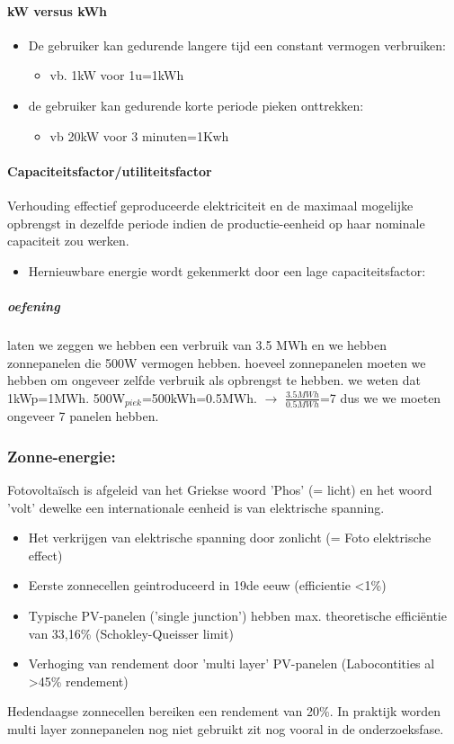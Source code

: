 \documentclass[12pt]{article}
\begin{document}
\paragraph{kW versus kWh}
\begin{itemize}
    \item De gebruiker kan gedurende langere tijd een constant vermogen verbruiken:\begin{itemize}
        \item vb. 1kW voor 1u=1kWh
    \end{itemize}
    \item de gebruiker kan gedurende korte periode pieken onttrekken:\begin{itemize}
        \item vb 20kW voor 3 minuten=1Kwh
    \end{itemize}
\end{itemize}
\paragraph{Capaciteitsfactor/utiliteitsfactor}
Verhouding effectief geproduceerde elektriciteit en de maximaal mogelijke opbrengst in dezelfde periode indien de productie-eenheid op haar nominale capaciteit zou werken.\begin{itemize}
    \item Hernieuwbare energie wordt gekenmerkt door een lage capaciteitsfactor:
\end{itemize}
\subparagraph{oefening}
laten we zeggen we hebben een verbruik van 3.5 MWh en we hebben zonnepanelen die 500W vermogen hebben.
hoeveel zonnepanelen moeten we hebben om ongeveer zelfde verbruik als opbrengst te hebben. we weten dat 1kWp=1MWh. 500W$_{piek}$=500kWh=0.5MWh. $\rightarrow$ $\frac{3.5MWh}{0.5MWh}$=7 dus we we moeten ongeveer 7 panelen hebben.
\subsubsection{Zonne-energie:}
Fotovoltaïsch is afgeleid van het Griekse woord 'Phos' (= licht) en het woord 'volt' dewelke een
internationale eenheid is van elektrische spanning.\begin{itemize}
    \item Het verkrijgen van elektrische spanning door zonlicht (= Foto elektrische effect)
    \item Eerste zonnecellen geintroduceerd in 19de eeuw (efficientie <1\%)
    \item Typische PV-panelen ('single junction') hebben max. theoretische efficiëntie van 33,16\% (Schokley-Queisser limit)
    \item Verhoging van rendement door 'multi layer' PV-panelen (Labocontities al >45\% rendement)
\end{itemize}
Hedendaagse zonnecellen bereiken een rendement van 20\%. In praktijk worden multi layer zonnepanelen nog niet gebruikt zit nog vooral in de onderzoeksfase.
\end{document}
